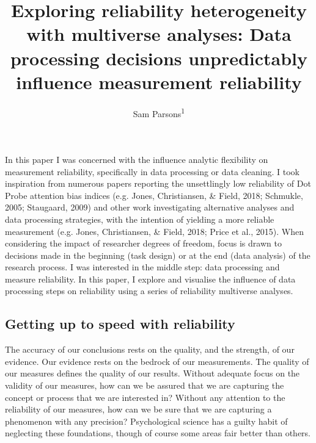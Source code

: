 \documentclass[
  english,
  man,floatsintext]{apa6}
\title{Exploring reliability heterogeneity with multiverse analyses: Data processing decisions unpredictably influence measurement reliability}
\author{Sam Parsons\textsuperscript{1}}
\date{}
\affiliation{\vspace{0.5cm}\textsuperscript{1} Radboud University Medical Center}
\begin{document}
\maketitle

In this paper I was concerned with the influence analytic flexibility on measurement reliability, specifically in data processing or data cleaning. I took inspiration from numerous papers reporting the unsettlingly low reliability of Dot Probe attention bias indices (e.g. Jones, Christiansen, \& Field, 2018; Schmukle, 2005; Staugaard, 2009) and other work investigating alternative analyses and data processing strategies, with the intention of yielding a more reliable measurement (e.g. Jones, Christiansen, \& Field, 2018; Price et al., 2015). When considering the impact of researcher degrees of freedom, focus is drawn to decisions made in the beginning (task design) or at the end (data analysis) of the research process. I was interested in the middle step: data processing and measure reliability. In this paper, I explore and visualise the influence of data processing steps on reliability using a series of reliability multiverse analyses.

\hypertarget{getting-up-to-speed-with-reliability}{%
\subsection{Getting up to speed with reliability}\label{getting-up-to-speed-with-reliability}}

The accuracy of our conclusions rests on the quality, and the strength, of our evidence. Our evidence rests on the bedrock of our measurements. The quality of our measures defines the quality of our results. Without adequate focus on the validity of our measures, how can we be assured that we are capturing the concept or process that we are interested in? Without any attention to the reliability of our measures, how can we be sure that we are capturing a phenomenon with any precision? Psychological science has a guilty habit of neglecting these foundations, though of course some areas fair better than others.
\end{document}
